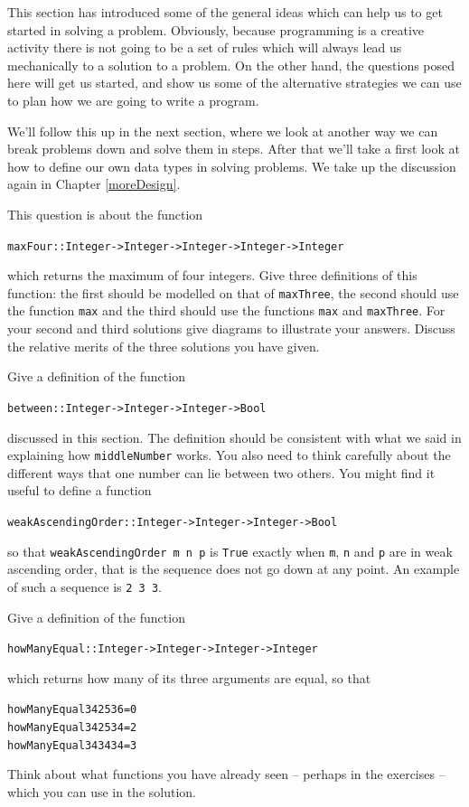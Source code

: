 This section has introduced some of the general ideas which can help us
to get started in solving a problem. Obviously, because programming is a creative
activity  there is not going to be a set of rules
which will always lead us mechanically to a solution to a problem. On
the other hand, the questions posed here will get us started, and show
us some of the alternative strategies we can use to plan how we are
going to write a program. 

We'll follow this up in the next section, where we look at another way we can break problems down and solve them in steps. After that we'll take a first look at how to define our own data types in solving problems. We take up the discussion again in Chapter \ref{moreDesign}.

\begin{exercises}

\item
This question is about the function
\begin{alltt}
maxFour :: Integer -> Integer -> Integer -> Integer -> Integer
\end{alltt}
which returns the maximum of four integers. Give three definitions of this
function: the first should be modelled
on that of \texttt{maxThree}, the second should use the function
\texttt{max} and the third should use the functions \texttt{max} and
\texttt{maxThree}. For your second and third solutions give diagrams
to illustrate your answers. Discuss the relative merits of the three
solutions
you have given.

\item
Give a definition of the function 
\begin{alltt}
between :: Integer -> Integer -> Integer -> Bool
\end{alltt}
discussed in this section. The definition should be consistent with what we said
in explaining how \texttt{middleNumber}
works. You also need to think carefully about the different ways that
one number can lie between two others. You might find it useful to
define a function
\begin{alltt}
weakAscendingOrder :: Integer -> Integer -> Integer -> Bool
\end{alltt}
so that \texttt{weakAscendingOrder m n p} is \texttt{True} exactly when
\texttt{m}, \texttt{n} and \texttt{p} are in weak ascending order, that is the sequence
does not go down at any point. An example of such a sequence is 
\texttt{2 3 3}.

\item
Give a definition of the function
\begin{alltt}
howManyEqual :: Integer -> Integer -> Integer -> Integer
\end{alltt}
which returns how many of its three arguments are equal, so that
\begin{alltt}
howManyEqual 34 25 36 = 0
howManyEqual 34 25 34 = 2
howManyEqual 34 34 34 = 3
\end{alltt}
Think about what functions you have already seen -- perhaps in the exercises --
which you can use in the solution.


\end{exercises}
